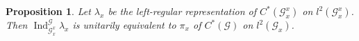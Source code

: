\documentclass[a4paper]{amsart}
\newcommand{\Ind}{\operatorname{Ind}}
\newcommand{\maG}{\mathcal G}
\newcommand\<{\langle}
\renewcommand\>{\rangle}
\newtheorem{proposition}[theorem]{Proposition}
\theoremstyle{definition}
\theoremstyle{remark}
\begin{document}
\begin{proposition}
Let $\lambda_x$ be the left-regular representation of $C^*(\maG_x^x)$ on $l^2(\maG_x^x)$.
Then $\Ind_{\maG_x^x}^{\maG}\lambda_x$ is unitarily equivalent to $\pi_x$ of $C^*(\maG)$ on $l^2(\maG_x)$.
\end{proposition}

\vspace{0.3cm}


\end{document}
